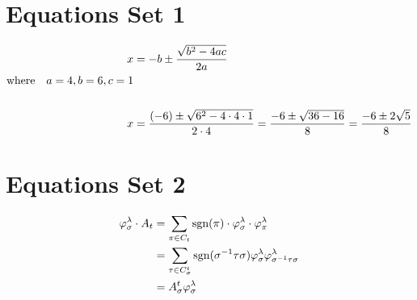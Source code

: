 \documentclass[12pt, a4paper]{article}
\begin{document}
	
	\section*{Equations Set 1}
	
	\begin{align}
		x &= -b \pm \frac{\sqrt{b^2 - 4ac}}{2a} \notag \\
		\text{where} \quad a = 4, b = 6, c = 1 \notag \\ \notag \\
		x &= \frac{(-6) \pm \sqrt{6^2 - 4 \cdot 4 \cdot 1}}{2 \cdot 4} = \frac{-6 \pm \sqrt{36 - 16}}{8} = \frac{-6 \pm 2\sqrt{5}}{8} \notag 
	\end{align}
	
	\section*{Equations Set 2}
	
	\begin{align}
		\varphi_{\sigma}^{\lambda} \cdot A_{t} &= \sum_{\pi \in C_{t}} \text{sgn}(\pi) \cdot \varphi_{\sigma}^{\lambda} \cdot \varphi_{\pi}^{\lambda} \notag \\
		&= \sum_{\tau \in C_{\sigma}^{t}} \text{sgn}(\sigma^{-1} \tau \sigma) \varphi_{\sigma}^{\lambda} \varphi_{\sigma^{-1} \tau \sigma}^{\lambda} \notag \\
		&= A_{\sigma}^{t} \varphi_{\sigma}^{\lambda} \notag 
	\end{align}
	
\end{document}
